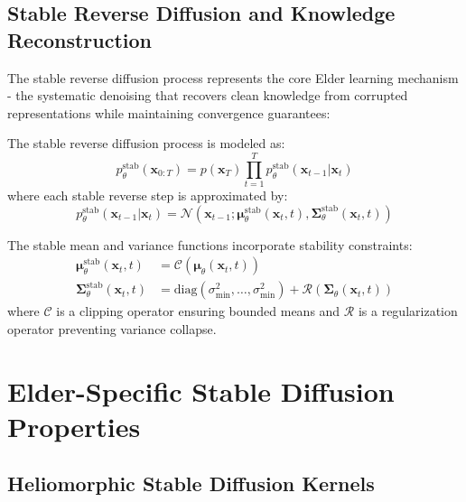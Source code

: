 \subsection{Stable Reverse Diffusion and Knowledge Reconstruction}

The stable reverse diffusion process represents the core Elder learning mechanism - the systematic denoising that recovers clean knowledge from corrupted representations while maintaining convergence guarantees:

\begin{definition}
The stable reverse diffusion process is modeled as:
\begin{equation}
p_\theta^{\text{stab}}(\mathbf{x}_{0:T}) = p(\mathbf{x}_T) \prod_{t=1}^T p_\theta^{\text{stab}}(\mathbf{x}_{t-1} | \mathbf{x}_t)
\end{equation}
where each stable reverse step is approximated by:
\begin{equation}
p_\theta^{\text{stab}}(\mathbf{x}_{t-1} | \mathbf{x}_t) = \mathcal{N}(\mathbf{x}_{t-1}; \boldsymbol{\mu}_\theta^{\text{stab}}(\mathbf{x}_t, t), \boldsymbol{\Sigma}_\theta^{\text{stab}}(\mathbf{x}_t, t))
\end{equation}
\end{definition}

\begin{definition}
The stable mean and variance functions incorporate stability constraints:
\begin{align}
\boldsymbol{\mu}_\theta^{\text{stab}}(\mathbf{x}_t, t) &= \mathcal{C}(\boldsymbol{\mu}_\theta(\mathbf{x}_t, t)) \\
\boldsymbol{\Sigma}_\theta^{\text{stab}}(\mathbf{x}_t, t) &= \text{diag}(\sigma_{\min}^2, \ldots, \sigma_{\min}^2) + \mathcal{R}(\boldsymbol{\Sigma}_\theta(\mathbf{x}_t, t))
\end{align}
where $\mathcal{C}$ is a clipping operator ensuring bounded means and $\mathcal{R}$ is a regularization operator preventing variance collapse.
\end{definition}

\section{Elder-Specific Stable Diffusion Properties}

\subsection{Heliomorphic Stable Diffusion Kernels}

